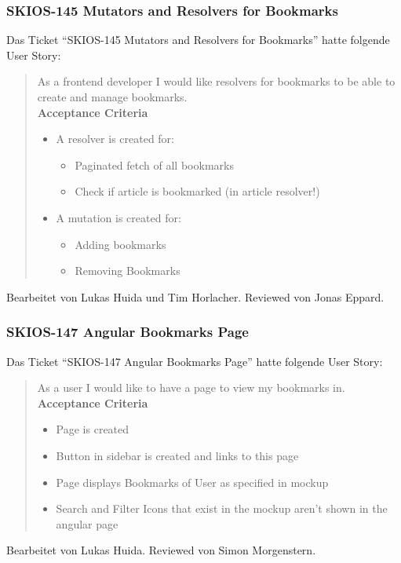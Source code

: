 \subsubsection{SKIOS-145 Mutators and Resolvers for Bookmarks}
Das Ticket \enquote{SKIOS-145 Mutators and Resolvers for Bookmarks} hatte folgende User Story:
\begin{quotation}
    As a frontend developer I would like resolvers for bookmarks to be able to create and manage bookmarks. \\
\textbf{Acceptance Criteria}
\begin{itemize}
    \item A resolver is created for:
    \begin{itemize}
        \item Paginated fetch of all bookmarks
        \item Check if article is bookmarked (in article resolver!)
    \end{itemize}
    \item A mutation is created for:
    \begin{itemize}
        \item Adding bookmarks
        \item Removing Bookmarks
    \end{itemize}
\end{itemize}
\end{quotation}
Bearbeitet von Lukas Huida und Tim Horlacher.
Reviewed von Jonas Eppard.

\subsubsection{SKIOS-147 Angular Bookmarks Page} \label{story:147}
Das Ticket \enquote{SKIOS-147 Angular Bookmarks Page} hatte folgende User Story:
\begin{quotation}
    As a user I would like to have a page to view my bookmarks in. \\
\textbf{Acceptance Criteria}
\begin{itemize}
    \item Page is created
    \item Button in sidebar is created and links to this page
    \item Page displays Bookmarks of User as specified in mockup
    \item Search and Filter Icons that exist in the mockup aren't shown in the angular page
\end{itemize}
\end{quotation}
Bearbeitet von Lukas Huida.
Reviewed von Simon Morgenstern.

